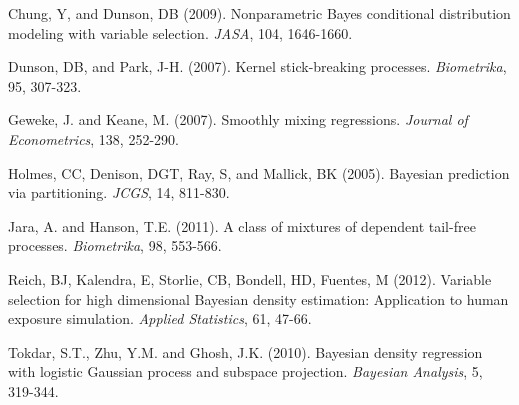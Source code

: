\documentclass[11pt]{article}
\begin{document}








{}
\begin{description}
\item Chung, Y, and Dunson, DB (2009). Nonparametric Bayes conditional distribution modeling with variable selection. {\em JASA}, 104, 1646-1660.

\item Dunson, DB, and Park, J-H. (2007). Kernel stick-breaking processes. {\em Biometrika}, 95, 307-323.

\item Geweke, J. and Keane, M. (2007). Smoothly mixing regressions. {\em Journal of Econometrics}, 138, 252-290.

\item Holmes, CC, Denison, DGT, Ray, S, and Mallick, BK (2005). Bayesian prediction via partitioning.  {\em JCGS}, 14, 811-830.

\item Jara, A. and Hanson, T.E. (2011). A class of mixtures of dependent tail-free processes. {\em Biometrika}, 98, 553-566.

\item Reich, BJ, Kalendra, E, Storlie, CB, Bondell, HD, Fuentes, M (2012). Variable selection for high dimensional Bayesian density estimation: Application to human exposure simulation. {\em Applied Statistics}, 61, 47-66.

\item Tokdar, S.T., Zhu, Y.M. and Ghosh, J.K. (2010). Bayesian density regression with logistic Gaussian process and subspace projection. {\em Bayesian Analysis}, 5, 319-344.
\end{description}
\end{document}
